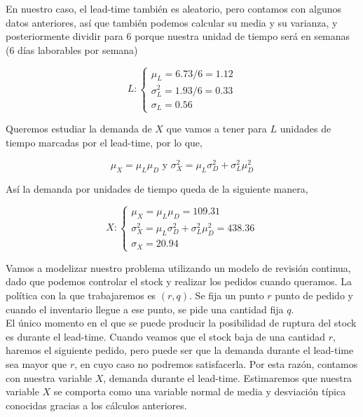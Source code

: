 \documentclass[a4paper,12pt]{article}
\begin{document}
En nuestro caso, el lead-time tambi\'en es aleatorio, pero contamos con algunos datos anteriores, as\'i que tambi\'en podemos calcular su media y su varianza, y posteriormente dividir para 6 porque nuestra unidad de tiempo ser\'a en semanas (6 d\'ias laborables por semana)


	\begin{equation*}
	L:  \left\lbrace \begin{array}{l}
		\mu_L = 6.73 / 6 = 1.12\\
		\sigma_L^2 = 1.93 / 6 = 0.33\\
		\sigma_L = 0.56
	\end{array}
	\right. 
	\end{equation*}

Queremos estudiar la demanda de $X$ que vamos a tener para $L$ unidades de tiempo marcadas por el lead-time, por lo que,

$$\mu_X = \mu_L \mu_D \text{ y } \sigma_X^2 = \mu_L \sigma_D^2 + \sigma_L^2 \mu_D^2$$

As\'i la demanda por unidades de tiempo queda de la siguiente manera,


	\begin{equation*}
	X:  \left\lbrace \begin{array}{l}
		\mu_X = \mu_L \mu_D = 109.31\\
		\sigma_X^2 = \mu_L \sigma_D^2 + \sigma_L^2 \mu_D^2 = 438.36\\
		\sigma_X = 20.94
	\end{array}
	\right. 
	\end{equation*}

Vamos a modelizar nuestro problema utilizando un modelo de revisi\'on continua, dado que podemos controlar el stock y realizar los pedidos cuando queramos. La pol\'itica con la que trabajaremos es $(r, q)$. Se fija un punto $r$ punto de pedido y cuando el inventario llegue a ese punto, se pide una cantidad fija $q$. \\

El \'unico momento en el que se puede producir la posibilidad de ruptura del stock es durante el lead-time. Cuando veamos que el stock baja de una cantidad $r$, haremos el siguiente pedido, pero puede ser que la demanda durante el lead-time sea mayor que $r$, en cuyo caso no podremos satisfacerla. Por esta raz\'on, contamos con nuestra variable $X$, demanda durante el lead-time. Estimaremos que nuestra variable $X$ se comporta como una variable normal de media y desviaci\'on t\'ipica conocidas gracias a los c\'alculos anteriores.\\
\end{document}
